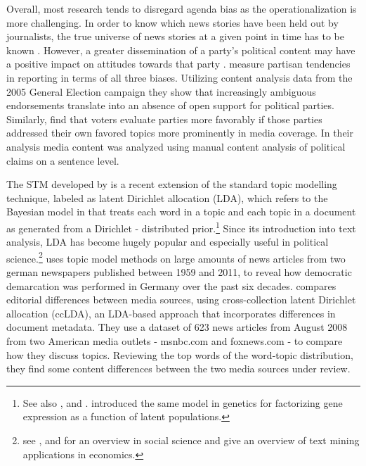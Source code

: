 \documentclass[12pt,a4paper,notitlepage]{article}
\begin{document}
Overall, most research tends to disregard agenda bias as the operationalization is more challenging. In order to know which news stories have been held out by journalists, the true universe of news stories at a given point in time has to be known \citet{dalessio_media_2000}. However, a greater dissemination of a party's political content may have a positive impact on attitudes towards that party \citep{benewick_floating_1969, eberl_one_2017}. \citet{brandenburg_party_2006} measure partisan tendencies in reporting in terms of all three biases. Utilizing content analysis data from the 2005 General Election campaign they show that increasingly ambiguous endorsements translate into an absence of open support for political parties. Similarly, \citet{eberl_one_2017} find that voters evaluate parties more favorably if those parties addressed their own favored topics more prominently in media coverage. In their analysis media content was analyzed using manual content analysis of political claims on a sentence level.

The STM developed by \citet{roberts_model_2016} is a recent extension of the standard topic modelling technique, labeled as latent Dirichlet allocation (LDA), which refers to the Bayesian model in \citet{blei_latent_2003} that treats each word in a topic and each topic in a document as generated from a Dirichlet - distributed prior.\footnote{See also \citet{griffiths_probabilistic_2002}, \citet{griffiths_finding_2004} and \citet{hofmann_probabilistic_1999}. \citet{pritchard_inference_2000} introduced the same model in genetics for factorizing gene expression as a function of latent populations.} Since its introduction into text analysis, LDA has become hugely popular and especially useful in political science.\footnote{see \citet{blei_probabilistic_2012}, \citet{grimmer_text_2013} and \citet{wiedmann_text_2016} for an overview in social science and \citet{gentzkow_text_2017} give an overview of text mining applications in economics.} \citet{wiedmann_text_2016} uses topic model methods on large amounts of news articles from two german newspapers published between 1959 and 2011, to reveal how democratic demarcation was performed in Germany over the past six decades. \citet{paul_cross-collection_2009} compares editorial differences between media sources, using cross-collection latent Dirichlet allocation (ccLDA), an LDA-based approach that incorporates differences in document metadata. They use a dataset of 623 news articles from August 2008 from two American media outlets - msnbc.com and foxnews.com - to compare how they discuss topics. Reviewing the top words of the word-topic distribution, they find some content differences between the two media sources under review. 
\end{document}
